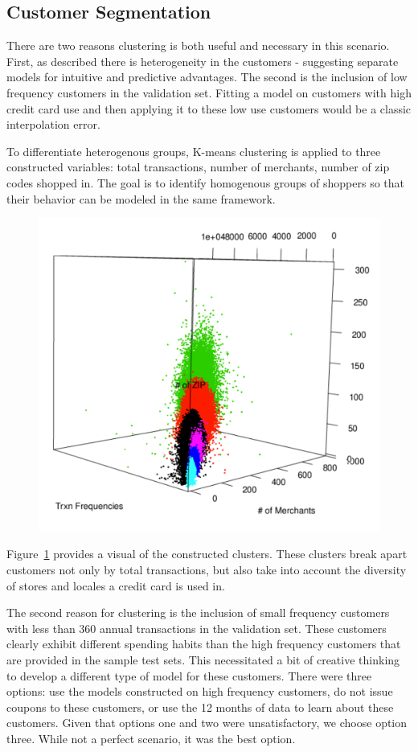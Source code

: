 \documentclass[12pt]{article} %
\begin{document}
\subsection{Customer Segmentation}
There are two reasons clustering is both useful and necessary in this scenario.  First, as described there is heterogeneity in the customers - suggesting separate models for intuitive and predictive advantages.  The second is the inclusion of low frequency customers in the validation set.  Fitting a model on customers with high credit card use and then applying it to these low use customers would be a classic interpolation error.

To differentiate heterogenous groups, K-means clustering is applied to three constructed variables: total transactions, number of merchants, number of zip codes shopped in.  The goal is to identify homogenous groups of shoppers so that their behavior can be modeled in the same framework.
\begin{figure}[h!]
\centering
\includegraphics[width=6in]{k_means.pdf}
\label{fig:cluster}
\end{figure}
Figure~\ref{fig:cluster} provides a visual of the constructed clusters.  These clusters break apart customers not only by total transactions, but also take into account the diversity of stores and locales a credit card is used in.

The second reason for clustering is the inclusion of small frequency customers with less than 360 annual transactions in the validation set.  These customers clearly exhibit different spending habits than the high frequency customers that are provided in the sample test sets.  This necessitated a bit of creative thinking to develop a different type of model for these customers.  There were three options: use the models constructed on high frequency customers, do not issue coupons to these customers, or use the 12 months of data to learn about these customers.  Given that options one and two were unsatisfactory, we choose option three.  While not a perfect scenario, it was the best option. 
\end{document}
